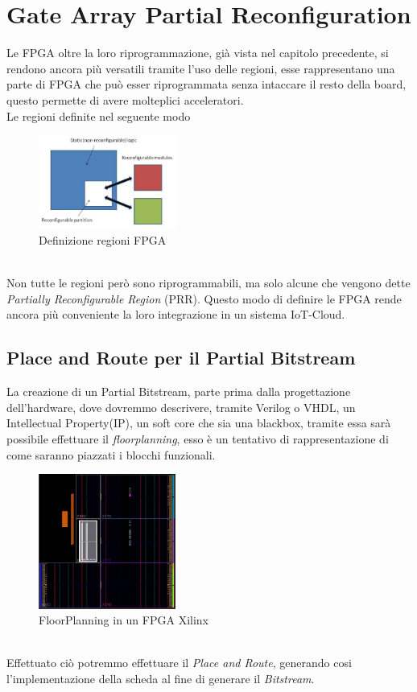 \chapter{Gate Array Partial Reconfiguration}
\label{cap5}
Le FPGA oltre la loro riprogrammazione, già vista nel capitolo precedente, si rendono ancora più versatili tramite l'uso delle regioni, esse rappresentano una parte di FPGA che può esser riprogrammata senza intaccare il resto della board, questo permette di avere molteplici acceleratori.\\
Le regioni definite nel seguente modo
\begin{figure}
    \centering
    \includegraphics[width=0.4\textwidth]{images/PR1.png}
    \caption{Definizione regioni FPGA}
    \label{fig:my_label}
\end{figure}\\
Non tutte le regioni però sono riprogrammabili, ma solo alcune che vengono dette \textit{Partially Reconfigurable Region} (PRR). Questo modo di definire le FPGA rende ancora più conveniente la loro integrazione in un sistema IoT-Cloud.
\section{Place and Route per il Partial Bitstream}
La creazione di un Partial Bitstream, parte prima dalla progettazione dell'hardware, dove dovremmo descrivere, tramite Verilog o VHDL, un Intellectual Property(IP)\cite{PRRGIT}, un soft core che sia una blackbox, tramite essa sarà possibile effettuare il \textit{floorplanning}, esso è un tentativo di rappresentazione di come saranno piazzati i blocchi funzionali.
\begin{figure}
    \centering
    \includegraphics[width=0.4\textwidth]{images/Floor1.jpg}
    \caption{FloorPlanning in un FPGA Xilinx}
    \label{fig:my_label}
\end{figure}\\
Effettuato ciò potremmo effettuare il \textit{Place and Route}, generando cosi l'implementazione della scheda al fine di generare il \textit{Bitstream}\cite{PRR}. 
